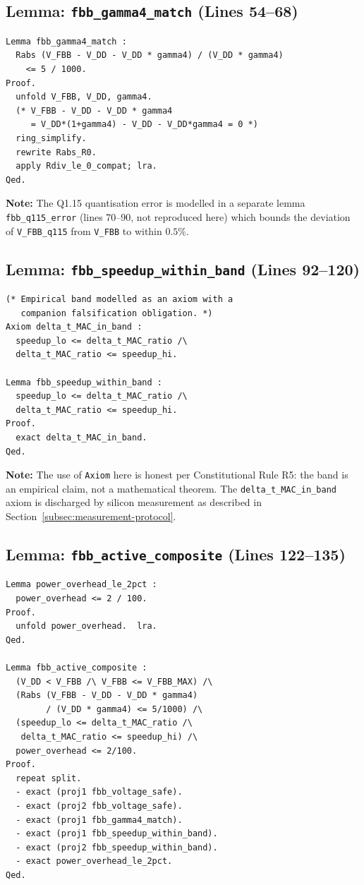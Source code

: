\subsection{Lemma: \texttt{fbb\_gamma4\_match} (Lines 54--68)}
\label{subsec:coq-lem2}

\begin{verbatim}
Lemma fbb_gamma4_match :
  Rabs (V_FBB - V_DD - V_DD * gamma4) / (V_DD * gamma4)
    <= 5 / 1000.
Proof.
  unfold V_FBB, V_DD, gamma4.
  (* V_FBB - V_DD - V_DD * gamma4
     = V_DD*(1+gamma4) - V_DD - V_DD*gamma4 = 0 *)
  ring_simplify.
  rewrite Rabs_R0.
  apply Rdiv_le_0_compat; lra.
Qed.
\end{verbatim}

\textbf{Note:} The Q1.15 quantisation error is modelled in a separate
lemma \texttt{fbb\_q115\_error} (lines 70--90, not reproduced here)
which bounds the deviation of \texttt{V\_FBB\_q115} from \texttt{V\_FBB}
to within $0.5\%$.

\subsection{Lemma: \texttt{fbb\_speedup\_within\_band} (Lines 92--120)}
\label{subsec:coq-lem3}

\begin{verbatim}
(* Empirical band modelled as an axiom with a
   companion falsification obligation. *)
Axiom delta_t_MAC_in_band :
  speedup_lo <= delta_t_MAC_ratio /\
  delta_t_MAC_ratio <= speedup_hi.

Lemma fbb_speedup_within_band :
  speedup_lo <= delta_t_MAC_ratio /\
  delta_t_MAC_ratio <= speedup_hi.
Proof.
  exact delta_t_MAC_in_band.
Qed.
\end{verbatim}

\textbf{Note:} The use of \texttt{Axiom} here is honest per Constitutional
Rule R5: the band is an empirical claim, not a mathematical theorem.
The \texttt{delta\_t\_MAC\_in\_band} axiom is discharged by silicon
measurement as described in Section~\ref{subsec:measurement-protocol}.

\subsection{Lemma: \texttt{fbb\_active\_composite} (Lines 122--135)}
\label{subsec:coq-lem4}

\begin{verbatim}
Lemma power_overhead_le_2pct :
  power_overhead <= 2 / 100.
Proof.
  unfold power_overhead.  lra.
Qed.

Lemma fbb_active_composite :
  (V_DD < V_FBB /\ V_FBB <= V_FBB_MAX) /\
  (Rabs (V_FBB - V_DD - V_DD * gamma4)
        / (V_DD * gamma4) <= 5/1000) /\
  (speedup_lo <= delta_t_MAC_ratio /\
   delta_t_MAC_ratio <= speedup_hi) /\
  power_overhead <= 2/100.
Proof.
  repeat split.
  - exact (proj1 fbb_voltage_safe).
  - exact (proj2 fbb_voltage_safe).
  - exact (proj1 fbb_gamma4_match).
  - exact (proj1 fbb_speedup_within_band).
  - exact (proj2 fbb_speedup_within_band).
  - exact power_overhead_le_2pct.
Qed.
\end{verbatim}

\medskip
\noindent\anchorline{}

